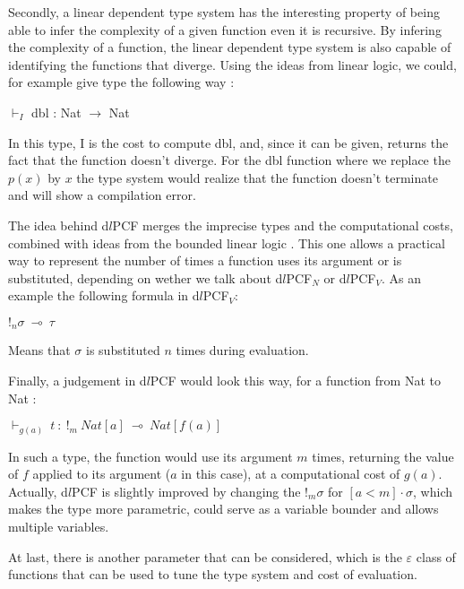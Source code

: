 \documentclass[a4paper,12pt]{article}
\begin{document}
\medskip

Secondly, a linear dependent type system has the interesting property of
being able to infer the complexity of a given function even it is
recursive. By infering the complexity of a function, the linear
dependent type system is also capable of identifying the functions that
diverge. Using the ideas from linear logic, we could, for
example give type the following way :

\begin{center}
$\vdash_{I}$ dbl : Nat $\rightarrow$ Nat
\end{center}

In this type, I is the cost to compute dbl, and, since it can be given, returns
the fact that the function doesn't diverge. For the dbl function where
we replace the $p(x)$ by $x$ the type system would realize that the function
doesn't terminate and will show a compilation error.

The idea behind d$l$PCF merges the imprecise types and the computational
costs, combined with ideas from the bounded linear logic
\cite{boundedlinearlogic}. This one allows a practical way to
represent the number of times a function uses its argument or is
substituted, depending on wether we talk about d$l$PCF$_{N}$ or d$l$PCF$_{V}$. 
As an example the following formula in d$l$PCF$_{V} $:

\begin{center}
$!_{n}\sigma~\multimap~\tau$
\end{center} 

Means that $\sigma$ is substituted $n$ times during evaluation. 

\medskip

Finally, a judgement in d$l$PCF would look this way, for a function from Nat to
Nat :

\begin{center}
$\vdash_{g(a)}~t~:~!_{m}~Nat[a]~\multimap~Nat[f(a)]$ 
\end{center}

In such a type, the function would use its argument $m$ times, returning the
value of $f$ applied to its argument ($a$ in this case), at a computational cost
of $g(a)$. Actually, d$l$PCF is slightly improved by changing the $!_{m}\sigma$
for $[a < m] \cdot \sigma$, which makes the type more parametric, could serve as
a variable bounder and allows multiple variables.

At last, there is another parameter that can be considered, which is the
$\varepsilon$ class of functions that can be used to tune the type system and
cost of evaluation.
\end{document}
